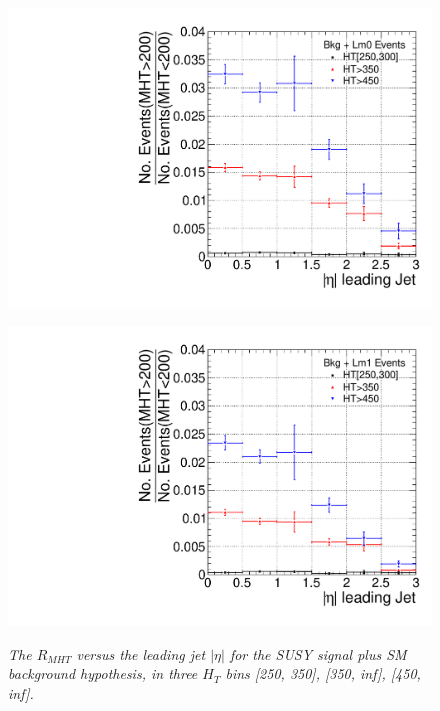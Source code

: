 \begin{figure}[h!]
\begin{minipage}[b]{0.5\linewidth}
\centering
{\label{fig:aT}\includegraphics[scale=0.4]{./plots/MHT-NT7-Lm0-MCerr}} 
\end{minipage}
\begin{minipage}[b]{0.5\linewidth}
\centering
{\label{fig:mht}\includegraphics[scale=0.4]{./plots/MHT-NT7-Lm1-MCerr}} 
\end{minipage}
\caption{\textit{The $R_{MHT}$ versus the leading jet $|\eta|$ for the SUSY signal plus SM background hypothesis, in three $H_{T}$ bins [250, 350], [350, inf], [450, inf].} }
\label{fig:app2}
\end{figure}

